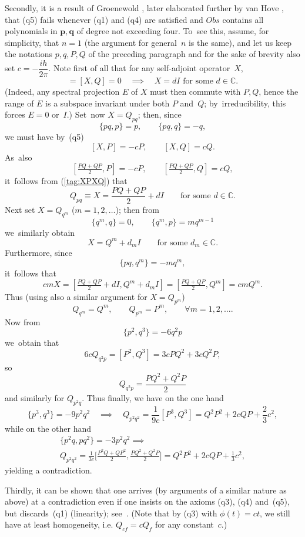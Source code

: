 \documentclass[12pt]{amsart}
\numberwithin{equation}{section}
\theoremstyle{remark}
\newcommand\Obs{Obs}
\newcommand{\CC}{\C}
\newcommand{\bp}{\mathbf p}
\newcommand{\bq}{\mathbf q}
\newcommand{\C}{\mathbb C}
\begin{document}
Secondly, it is a result of Groenewold \cite{bib:Groe}, later elaborated
further by van Hove \cite{bib:vHove}, that (q5) fails whenever (q1) and (q4)
are satisfied and $\Obs$ contains all polynomials in $\bp,\bq$ of degree not
exceeding four. To~see this, assume, for simplicity, that $n=1$ (the argument
for general~$n$ is the same), and let us keep the notations $p,q,P,Q$ of the
preceding paragraph and for the sake of brevity also set $c=-\dfrac{ih}{2\pi}$.
Note first of all that for any self-adjoint operator~$X$,
\begin{equation}  [X,P]=[X,Q]=0 \quad\implies\quad X=dI\text{ for some }
d\in\CC. \label{tag:XPXQ} \end{equation}
(Indeed, any spectral projection $E$ of $X$ must then commute with $P,Q$, hence
the range of $E$ is a subspace invariant under both $P$ and~$Q$;
by~irreducibility, this forces $E=0$ or~$I$.) Set~now $X=Q_{pq}$; then, since
$$ \{pq,p\}=p, \qquad \{pq,q\}=-q,  $$
we must have by~(q5)
$$ [X,P]=-cP, \qquad [X,Q]=cQ.  $$
As~also
$$ [ \tfrac{PQ+QP}2,P]=-cP, \qquad [\tfrac{PQ+QP}2,Q]=cQ,  $$
it~follows from (\ref{tag:XPXQ}) that
$$ Q_{pq} \equiv X = \frac{PQ+QP}2 + d I \qquad\text{for some }d\in\CC.  $$
Next set $X=Q_{q^m}$ ($m=1,2,\dots$); then from
$$ \{q^m,q\}=0, \qquad \{q^m,p\}=m q^{m-1}  $$
we~similarly obtain
$$ X=Q^m + d_m I \qquad\text{for some }d_m\in\CC.  $$
Furthermore, since
$$ \{pq,q^m\}= - m q^m,  $$
it~follows that
$$ cmX=[\tfrac{PQ+QP}2+dI,Q^m+d_m I] = [\tfrac{PQ+QP}2,Q^m] =cm Q^m.  $$
Thus (using also a similar argument for $X=Q_{p^m}$)
$$ Q_{q^m} = Q^m, \qquad Q_{p^m}=P^m, \qquad \forall m=1,2,\dots.  $$
Now from
$$ \{ p^2,q^3 \} = - 6q^2 p  $$
we~obtain that
$$ 6c Q_{q^2 p} = [P^2,Q^3] = 3c P Q^2+3c Q^2 P ,  $$
so
$$ Q_{q^2 p} = \frac{PQ^2+Q^2P}2  $$
and similarly for $Q_{p^2 q}$. Thus finally, we have on the one hand
$$ \{p^3,q^3\}=- 9p^2 q^2 \quad\implies\quad Q_{p^2 q^2} = \frac1{9c} [P^3,Q^3]
= Q^2 P^2 +2c QP + \frac23 c^2,  $$
while on the other hand
\begin{multline*}
\{p^2 q,p q^2\} = - 3 p^2 q^2 \implies \\ Q_{p^2 q^2}= \frac1{3c}
\Big[\frac{P^2Q+QP^2}2,\frac{PQ^2+Q^2P}2\Big]  = Q^2 P^2+2c QP+ \frac13c^2,
\end{multline*}
yielding a contradiction.

Thirdly, it can be shown that one arrives (by arguments of a similar nature as
above) at a contradiction even if one insists on the axioms (q3), (q4)
and~(q5), but discards~(q1) (linearity); see~\cite{bib:ETuy}. (Note that
by (q3) with  $\phi(t)=c t$, we still have at least homogeneity, i.e. $Q_{cf}=c
Q_f$ for any constant~$c$.)
\end{document}
